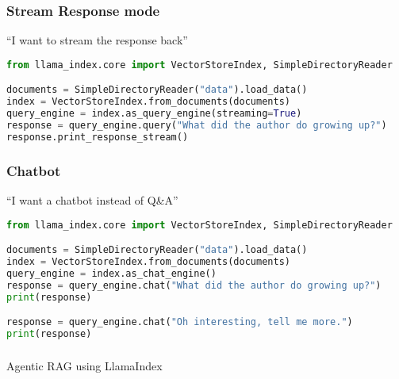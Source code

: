 \begin{frame}[fragile]\frametitle{Stream Response mode}

``I want to stream the response back''

\begin{lstlisting}[language=Python]
from llama_index.core import VectorStoreIndex, SimpleDirectoryReader

documents = SimpleDirectoryReader("data").load_data()
index = VectorStoreIndex.from_documents(documents)
query_engine = index.as_query_engine(streaming=True)
response = query_engine.query("What did the author do growing up?")
response.print_response_stream()
\end{lstlisting}
\end{frame}

\begin{frame}[fragile]\frametitle{Chatbot}

``I want a chatbot instead of Q\&A''

\begin{lstlisting}[language=Python]
from llama_index.core import VectorStoreIndex, SimpleDirectoryReader

documents = SimpleDirectoryReader("data").load_data()
index = VectorStoreIndex.from_documents(documents)
query_engine = index.as_chat_engine()
response = query_engine.chat("What did the author do growing up?")
print(response)

response = query_engine.chat("Oh interesting, tell me more.")
print(response)
\end{lstlisting}
\end{frame}

\begin{frame}[fragile]\frametitle{}
\begin{center}
{\Large Agentic RAG using LlamaIndex}
\end{center}
\end{frame}


